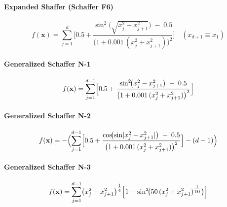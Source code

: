\paragraph{Expanded Shaffer (Schaffer F6)}
\begin{equation}
f(\mathbf{x})
= \sum_{j=1}^{d}\Biggl[
    0.5
    + \frac{\sin^2\!\bigl(\sqrt{x_{j}^2 + x_{j+1}^2}\bigr)\;-\;0.5}
           {\bigl(1 + 0.001\,(x_{j}^2 + x_{j+1}^2)\bigr)^{2}}
\Biggr]
\quad
(x_{d+1}\equiv x_{1})
\label{ben:expandedShaffer}
\end{equation}

\vspace{.095em}
\paragraph{Generalized Schaffer N-1}
\begin{equation}
f(\mathbf{x})
= \sum_{j=1}^{d-1}
  \Bigl[
    0.5
    + \frac{\sin^2\!\bigl(x_j^2 - x_{j+1}^2\bigr)\;-\;0.5}
           {\bigl(1 + 0.001\,(x_j^2 + x_{j+1}^2)\bigr)^{2}}
  \Bigr]
\label{ben:generalizedSchafferN1}
\end{equation}

\vspace{.095em}
\paragraph{Generalized Schaffer N-2}
\begin{equation}
f(\mathbf{x})
= -\Bigl(
    \sum_{j=1}^{d-1}
      \Bigl[
        0.5
        + \frac{\cos\!\bigl(\sin\lvert x_j^2 - x_{j+1}^2\rvert\bigr)\;-\;0.5}
               {\bigl(1 + 0.001\,(x_j^2 + x_{j+1}^2)\bigr)^{2}}
      \Bigr]
    - (d-1)
  \Bigr)
\label{ben:generalizedSchafferN2}
\end{equation}

\vspace{.095em}
\paragraph{Generalized Schaffer N-3}
\begin{equation}
f(\mathbf{x})
= \sum_{j=1}^{d-1}
  \bigl(x_j^2 + x_{j+1}^2\bigr)^{\tfrac14}
  \Bigl[
    1
    + \sin^2\!\bigl(50\,(x_j^2 + x_{j+1}^2)^{\tfrac{1}{10}}\bigr)
  \Bigr]
\label{ben:generalizedSchafferN3}
\end{equation}

\vspace{.095em}
